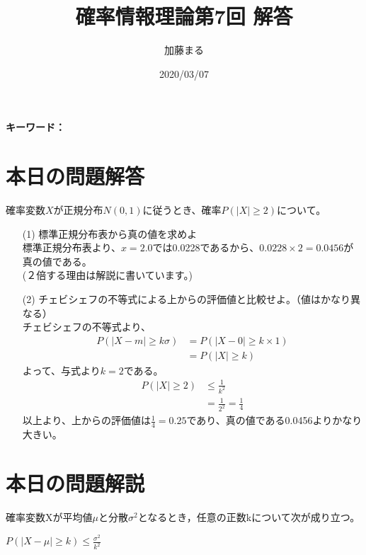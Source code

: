 \documentclass[a4j,uplatex,dvipdfmx]{jsarticle}
\title{確率情報理論第7回 解答}
\author{加藤まる}
\date{2020/03/07}
\begin{document}
\maketitle
\bf キーワード：
\rm

\section*{本日の問題解答}
確率変数$X$が正規分布$N(0,1)$に従うとき、確率$P(|X|\ge2)$について。
\begin{itemize}
  \item[(1)] 標準正規分布表から真の値を求めよ\\
    標準正規分布表より、$x=2.0$では0.0228であるから、$0.0228\times 2=0.0456$が真の値である。\\
    (２倍する理由は解説に書いています。)
  \item[(2)] チェビシェフの不等式による上からの評価値と比較せよ。（値はかなり異なる） \\
   チェビシェフの不等式より、
   \begin{equation}
     \begin{split}
      P(|X-m|\ge k \sigma) &= P(|X-0|\ge k \times 1) \\
      &= P(|X| \ge k)
     \end{split}
   \end{equation}
   よって、与式より$k=2$である。
   \begin{equation}
     \begin{split}
      P(|X| \ge 2) &\le \frac{1}{k^2} \\
      &= \frac{1}{2^2} = \frac{1}{4}
     \end{split}
   \end{equation}
   以上より、上からの評価値は$\frac{1}{4} = 0.25$であり、真の値である0.0456よりかなり大きい。
    
\end{itemize}

\section*{本日の問題解説}
\begin{tcolorbox}[
  title = チェビシェフの不等式,
]
確率変数Xが平均値$\mu$と分散$\sigma ^2$となるとき，任意の正数kについて次が成り立つ。
  \begin{center}
    $\displaystyle P(|X-\mu|\ge k)\le \frac{\sigma ^2}{k^2}$
  \end{center}
  \end{tcolorbox}
\end{document}
